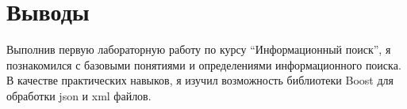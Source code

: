 \section{Выводы}
Выполнив первую лабораторную работу по курсу \enquote{Информационный поиск}, я познакомился с базовыми понятиями и определениями информационного поиска. В качестве практических навыков, я изучил возможность библиотеки Boost для обработки json и xml файлов.

\pagebreak
